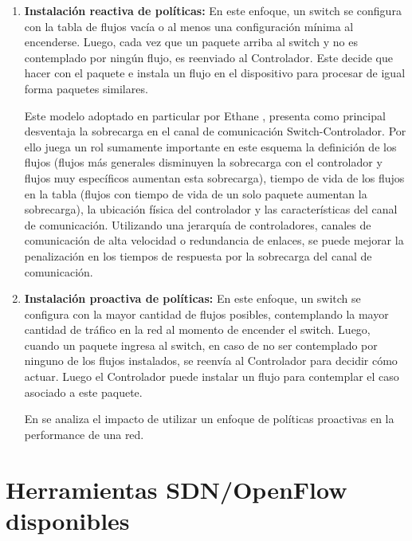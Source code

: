 \begin{enumerate}
\item \textbf{Instalación reactiva de políticas:} En este enfoque, un switch se configura con la tabla de flujos vac\'ia o al menos una configuración mínima al encenderse. Luego, cada vez que un paquete arriba al switch y no es contemplado por ning\'un flujo, es reenviado al Controlador. Este decide que hacer con el paquete e instala un flujo en el dispositivo para procesar de igual forma paquetes similares.

Este modelo adoptado en particular por Ethane \cite{casado2007ethane}, presenta como principal desventaja la sobrecarga en el canal de comunicación Switch-Controlador. Por ello juega un rol sumamente importante en este esquema la definición de los flujos (flujos m\'as generales disminuyen la sobrecarga con el controlador y flujos muy específicos aumentan esta sobrecarga), tiempo de vida de los flujos en la tabla (flujos con tiempo de vida de un solo paquete aumentan la sobrecarga), la ubicación física del controlador y las características del canal de comunicación. Utilizando una jerarquía de controladores, canales de comunicación de alta velocidad o redundancia de enlaces, se puede mejorar la penalizaci\'on en los tiempos de respuesta por la sobrecarga del canal de comunicación. 

\item \textbf{Instalación proactiva de políticas:} En este enfoque, un switch se configura con la mayor cantidad de flujos posibles, contemplando la mayor cantidad de tr\'afico en la red al momento de encender el switch. Luego, cuando un paquete ingresa al switch, en caso de no ser contemplado por ninguno de los flujos instalados, se reenvía al Controlador para decidir c\'omo actuar. Luego el Controlador puede instalar un flujo para contemplar el caso asociado a este paquete. 

En \cite{yu2011scalable} se analiza el impacto de utilizar un enfoque de políticas proactivas en la performance de una red.  

\end{enumerate} 


\section{Herramientas SDN/OpenFlow disponibles}
\label{section2.4}

